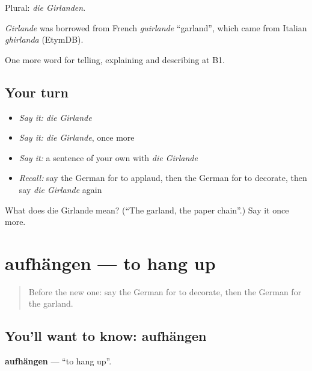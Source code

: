 Plural: \emph{die Girlanden}.

\begin{cousinweb}
\emph{Girlande} was borrowed from French \emph{guirlande} \textquotedblleft{}garland\textquotedblright{}, which came from Italian \emph{ghirlanda} (EtymDB).
\end{cousinweb}

\begin{grammarlens}[title={What you've built}]
One more word for telling, explaining and describing at B1.
\end{grammarlens}

\subsection*{Your turn}
\begin{itemize}
\raggedright
  \item \emph{Say it:} \emph{die Girlande}
  \item \emph{Say it:} \emph{die Girlande}, once more
  \item \emph{Say it:} a sentence of your own with \emph{die Girlande}
  \item \emph{Recall:} say the German for to applaud, then the German for to decorate, then say \emph{die Girlande} again
\end{itemize}

\begin{tcolorbox}[breakable,colback=teal!4,colframe=teal!35!black,title={Before you move on}]
What does die Girlande mean? (\textquotedblleft{}The garland, the paper chain\textquotedblright{}.) Say it once more.
\end{tcolorbox}
\section[aufhängen]{aufhängen — to hang up}

\label{lesson:GE-C309-aufhaengen}



\begin{quote}
Before the new one: say the German for to decorate, then the German for the garland.
\end{quote}

\subsection*{You'll want to know: aufhängen}
\textbf{aufhängen} — \textquotedblleft{}to hang up\textquotedblright{}.

